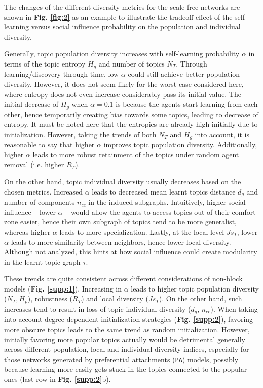 \documentclass{svproc}
\begin{document}
The changes of the different diversity metrics for the scale-free networks are shown in \textbf{Fig. \ref{fig:2}} as an example to illustrate the tradeoff effect of the self-learning versus social influence probability on the population and individual diversity.

Generally, topic population diversity increases with self-learning probability $\alpha$ in terms of the topic entropy $H_g$ and number of topics $N_T$. Through learning/discovery through time, low $\alpha$ could still achieve better population diversity. However, it does not seem likely for the worst case considered here, where entropy does not even increase considerably pass its initial value. The initial decrease of $H_g$ when $\alpha = 0.1$ is because the agents start learning from each other, hence temporarily creating bias towards some topics, leading to decrease of entropy. It must be noted here that the entropies are already high initially due to initialization. However, taking the trends of both $N_T$ and $H_g$ into account, it is reasonable to say that higher $\alpha$ improves topic population diversity. Additionally, higher $\alpha$ leads to more robust retainment of the topics under random agent removal (i.e. higher $R_T$).

On the other hand, topic individual diversity usually decreases based on the chosen metrics. Increased $\alpha$ leads to decreased mean learnt topics distance $d_g$ and number of components $n_{cc}$ in the induced subgraphs. Intuitively, higher social influence  -- lower $\alpha$ -- would allow the agents to access topics out of their comfort zone easier, hence their own subgraph of topics tend to be more generalist, whereas higher $\alpha$ leads to more specialization. Lastly, at the local level $Js_T$, lower $\alpha$ leads to more similarity between neighbors, hence lower local diversity. Although not analyzed, this hints at how social influence could create modularity in the learnt topic graph $\tau$.

These trends are quite consistent across different considerations of non-block models (\textbf{Fig. \ref{supp:1}}). Increasing in $\alpha$ leads to higher topic population diversity ($N_T, H_p$), robustness ($R_T$) and local diversity ($Js_T$). On the other hand, such increases tend to result in loss of topic individual diversity ($d_g$, $n_{cc}$). When taking into account degree-dependent initialization strategies (\textbf{Fig. \ref{supp:2}}), favoring more obscure topics leads to the same trend as random initialization. However, initially favoring more popular topics actually would be detrimental generally across different population, local and individual diversity indices, especially for those networks generated by preferential attachments (\texttt{PA}) models, possibly because learning more easily gets stuck in the topics connected to the popular ones (last row in \textbf{Fig. \ref{supp:2}}b).
\end{document}
